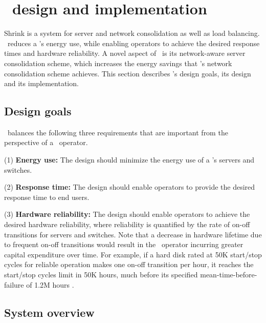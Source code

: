 

\section{\shrink\ design and implementation}
\label{sec:design}

Shrink is a system for server and network consolidation as well as load balancing. 
\shrink\ reduces a \cdc's energy use, while enabling operators to achieve the desired response times and hardware reliability.
A novel aspect of \shrink\ is its network-aware server consolidation scheme, which increases the energy savings that \shrink's network consolidation scheme achieves. This section describes \shrink's design goals, its design and its implementation.

\subsection{Design goals}
\shrink\  balances the following three requirements that are important from the perspective of a \cdc\ operator.

(1) \textbf{Energy use:} The design should minimize the energy use of a \cdc's servers and switches.

(2) \textbf{Response time:} The design should enable operators to provide the desired response time to end users. 

(3) \textbf{Hardware reliability:} The design should enable operators to achieve the desired hardware reliability, where reliability is quantified by the rate of on-off transitions for servers and switches. Note that a decrease in hardware lifetime due to frequent on-off transitions would result in the \cdc\ operator incurring greater capital expenditure over time. For example, if a hard disk rated at 50K start/stop cycles for reliable operation makes one on-off transition per hour, it reaches the start/stop cycles limit in 50K hours, much before its specified mean-time-before-failure of 1.2M hours \cite{seagate}.



\subsection{System overview}
\label{sec:overview}

